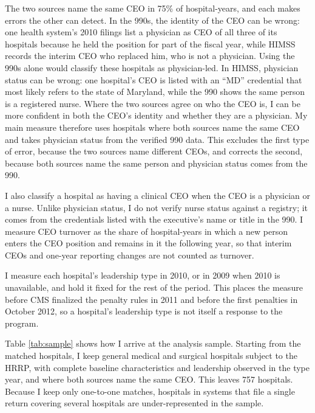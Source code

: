 \documentclass[12pt]{article}
\theoremstyle{definition}   %
\begin{document}
    The two sources name the same CEO in 75\% of hospital-years, and each makes errors the other can detect. In the 990s, the identity of the CEO can be wrong: one health system's 2010 filings list a physician as CEO of all three of its hospitals because he held the position for part of the fiscal year, while HIMSS records the interim CEO who replaced him, who is not a physician. Using the 990s alone would classify these hospitals as physician-led. In HIMSS, physician status can be wrong: one hospital's CEO is listed with an ``MD'' credential that most likely refers to the state of Maryland, while the 990 shows the same person is a registered nurse. Where the two sources agree on who the CEO is, I can be more confident in both the CEO's identity and whether they are a physician. My main measure therefore uses hospitals where both sources name the same CEO and takes physician status from the verified 990 data. This excludes the first type of error, because the two sources name different CEOs, and corrects the second, because both sources name the same person and physician status comes from the 990.
 
    I also classify a hospital as having a clinical CEO when the CEO is a physician or a nurse. Unlike physician status, I do not verify nurse status against a registry; it comes from the credentials listed with the executive's name or title in the 990. I measure CEO turnover as the share of hospital-years in which a new person enters the CEO position and remains in it the following year, so that interim CEOs and one-year reporting changes are not counted as turnover.
 
    I measure each hospital's leadership type in 2010, or in 2009 when 2010 is unavailable, and hold it fixed for the rest of the period. This places the measure before CMS finalized the penalty rules in 2011 and before the first penalties in October 2012, so a hospital's leadership type is not itself a response to the program.
 
    Table \ref{tab:sample} shows how I arrive at the analysis sample. Starting from the matched hospitals, I keep general medical and surgical hospitals subject to the HRRP, with complete baseline characteristics and leadership observed in the type year, and where both sources name the same CEO. This leaves 757 hospitals. Because I keep only one-to-one matches, hospitals in systems that file a single return covering several hospitals are under-represented in the sample.
\end{document}
